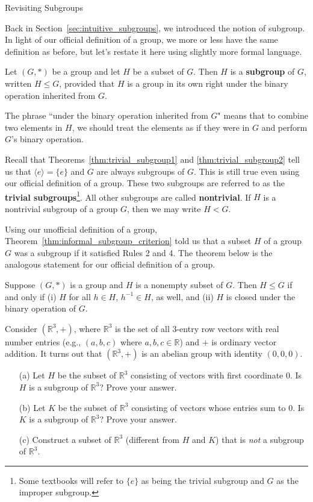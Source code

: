 \begin{section}{Revisiting Subgroups}

Back in Section~\ref{sec:intuitive_subgroups}, we introduced the notion of subgroup.  In light of our official definition of a group, we more or less have the same definition as before, but let's restate it here using slightly more formal language.

\begin{definition}
Let $(G,*)$ be a group and let $H$ be a subset of $G$.  Then $H$ is a \textbf{subgroup} of $G$, written $H\leq G$, provided that $H$ is a group in its own right under the binary operation inherited from $G$.
\end{definition}

The phrase ``under the binary operation inherited from $G$" means that to combine two elements in $H$, we should treat the elements as if they were in $G$ and perform $G$'s binary operation.

Recall that Theorems~\ref{thm:trivial_subgroup1} and \ref{thm:trivial_subgroup2} tell us that $\langle e\rangle=\{e\}$ and $G$ are always subgroups of $G$. This is still true even using our official definition of a group.  These two subgroups are referred to as the \textbf{trivial subgroups}\footnote{Some textbooks will refer to $\{e\}$ as being the trivial subgroup and $G$ as the improper subgroup.}.  All other subgroups are called \textbf{nontrivial}.  If $H$ is a nontrivial subgroup of a group $G$, then we may write $H<G$.

Using our unofficial definition of a group, Theorem~\ref{thm:informal_subgroup_criterion} told us that a subset $H$ of a group $G$ was a subgroup if it satisfied Rules 2 and 4.  The theorem below is the analogous statement for our official definition of a group.

\begin{theorem}\label{thm:subgroup_criterion}
Suppose $(G,*)$ is a group and $H$ is a nonempty subset of $G$.  Then $H\leq G$ if and only if (i) $H$ for all $h\in H$, $h^{-1} \in H$, as well, and (ii) $H$ is closed under the binary operation of $G$.
\end{theorem}

\begin{exercise}
Consider $(\mathbb{R}^3,+)$, where $\mathbb{R}^3$ is the set of all 3-entry row vectors with real number entries (e.g., $(a,b,c)$ where $a,b,c\in\mathbb{R}$) and $+$ is ordinary vector addition.  It turns out that $(\mathbb{R}^3,+)$ is an abelian group with identity $(0,0,0)$.  
\begin{enumerate}
\item[(a)] Let $H$ be the subset of $\mathbb{R}^3$ consisting of vectors with first coordinate 0.  Is $H$ is a subgroup of $\mathbb{R}^3$?  Prove your answer.
\item[(b)] Let $K$ be the subset of $\mathbb{R}^3$ consisting of vectors whose entries sum to 0.  Is $K$ is a subgroup of $\mathbb{R}^3$?  Prove your answer.
\item[(c)] Construct a subset of $\mathbb{R}^3$ (different from $H$ and $K$) that is \emph{not} a subgroup of $\mathbb{R}^3$.
\end{enumerate}
\end{exercise}


\end{section}
